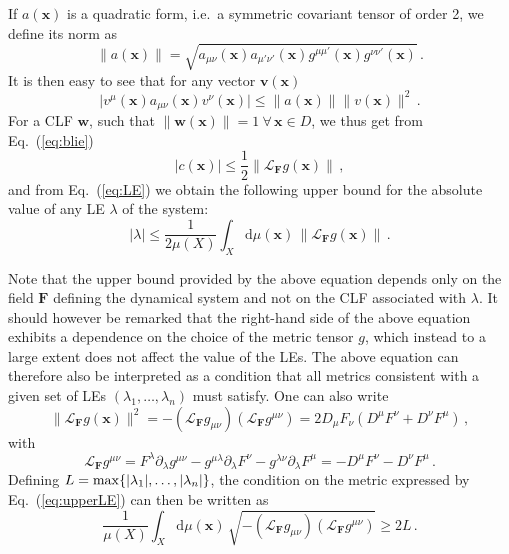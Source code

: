 \documentclass{article}
\theoremstyle{plain}
\theoremstyle{definition}
\theoremstyle{remark}
\newcommand{\vect}[1]{\boldsymbol{#1}}
\begin{document}
If $a(\vect{x})$ is a quadratic form, i.e.\ a symmetric covariant tensor
of order 2, we define its norm as
\begin{equation}\label{eq:norma}
\lVert a(\vect{x}) \rVert =\sqrt{a_{\mu\nu}(\vect{x}) a_{\mu'\nu'}(\vect{x})
g^{\mu\mu'}(\vect{x})g^{\nu\nu'}(\vect{x})}\,.
\end{equation}
It is then easy to see that for any vector $\vect v(\vect x)$
\begin{equation}\label{eq:alim}
\lvert v^\mu (\vect{x}) a_{\mu\nu}(\vect{x}) v^\nu (\vect{x})\rvert
\leq \lVert a(\vect{x}) \rVert \lVert v(\vect{x}) \rVert^2\,.
\end{equation}
For a CLF $\vect w$, such that 
$\lVert \vect{w}(\vect{x})\rVert=1 \ \forall\,\vect{x}\in D$,
we thus get from Eq.~(\ref{eq:blie}) 
\begin{equation}\label{eq:blim}
\lvert c(\vect{x})\rvert \leq \frac 12 \lVert 
\mathcal{L}_{\vect{F}} g(\vect{x}) \rVert\,,
\end{equation}
and from Eq.~(\ref{eq:LE}) we obtain the following upper bound for the
absolute value of any LE $\lambda$ of the system:
\begin{equation}\label{eq:upperLE}
   |\lambda|\leq  \frac {1}{2\mu(X)}
    \int_X \mathrm{d}\mu (\vect{x})\,
\lVert \mathcal{L}_{\vect{F}} g(\vect{x}) \rVert \, .
  \end{equation}

Note that the upper bound provided by the above equation depends only
on the field $\vect F$ defining the dynamical system and not on the CLF
associated with $\lambda$. It should however be remarked that the right-hand
side of the above equation exhibits a dependence on the choice of the
metric tensor $g$, which instead to a large extent does not affect the value
of the LEs. The above equation can therefore also be interpreted as a
condition that all metrics consistent with a given set of LEs $(\lambda_1, \dots,
\lambda_n)$ must satisfy. One can also write
\[
\lVert \mathcal{L}_{\vect{F}} g(\vect{x}) \rVert^2=
-\left(\mathcal{L}_{\vect{F}} g_{\mu\nu}\right)\left(\mathcal{L}_{\vect{F}} g^{\mu\nu}\right)
=2D_\mu F_\nu \left(D^\mu F^\nu + D^\nu F^\mu\right)\,,
\]
with
\[
\mathcal{L}_{\vect{F}} g^{\mu\nu}=F^\lambda \partial_\lambda g^{\mu\nu}
-g^{\mu\lambda}\partial_\lambda F^\nu - g^{\lambda\nu}\partial_\lambda F^\mu
=-D^\mu F^\nu - D^\nu F^\mu\,.
\]
Defining $L={\rm max}\{|\lambda_1|, \dots, |\lambda_n|\}$, the condition on the metric
expressed by Eq.~(\ref{eq:upperLE}) can then be written as
\[
\frac {1}{\mu(X)}\int_X \mathrm{d}\mu (\vect{x})\,
\sqrt{-\left(\mathcal{L}_{\vect{F}} g_{\mu\nu}\right)\left(\mathcal{L}_{\vect{F}} g^{\mu\nu}\right)}
\geq 2L \,.
\]
\end{document}
